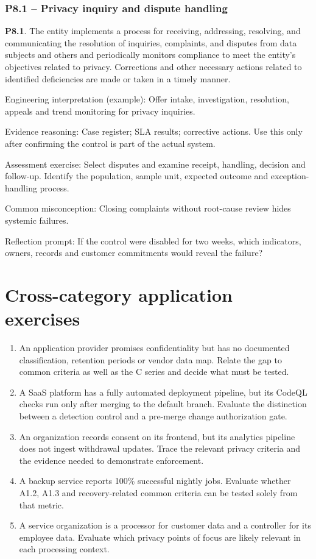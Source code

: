 \documentclass[10pt,oneside]{report}
\begin{document}
\subsection{P8.1 -- Privacy inquiry and dispute handling}
\begin{aicpabox}
\textbf{P8.1}. The entity implements a process for receiving, addressing, resolving, and communicating the resolution of inquiries, complaints, and disputes from data subjects and others and periodically monitors compliance to meet the entity's objectives related to privacy. Corrections and other necessary actions related to identified deficiencies are made or taken in a timely manner.\par{}
\end{aicpabox}
Engineering interpretation (example): Offer intake, investigation, resolution, appeals and trend monitoring for privacy inquiries.

Evidence reasoning: Case register; SLA results; corrective actions. Use this only after confirming the control is part of the actual system.

Assessment exercise: Select disputes and examine receipt, handling, decision and follow-up. Identify the population, sample unit, expected outcome and exception-handling process.

Common misconception: Closing complaints without root-cause review hides systemic failures.

Reflection prompt: If the control were disabled for two weeks, which indicators, owners, records and customer commitments would reveal the failure?

\chapter{Cross-category application exercises}
\begin{enumerate}
\item An application provider promises confidentiality but has no documented classification, retention periods or vendor data map. Relate the gap to common criteria as well as the C series and decide what must be tested.
\item A SaaS platform has a fully automated deployment pipeline, but its CodeQL checks run only after merging to the default branch. Evaluate the distinction between a detection control and a pre-merge change authorization gate.
\item An organization records consent on its frontend, but its analytics pipeline does not ingest withdrawal updates. Trace the relevant privacy criteria and the evidence needed to demonstrate enforcement.
\item A backup service reports 100\% successful nightly jobs. Evaluate whether A1.2, A1.3 and recovery-related common criteria can be tested solely from that metric.
\item A service organization is a processor for customer data and a controller for its employee data. Evaluate which privacy points of focus are likely relevant in each processing context.
\end{enumerate}
\end{document}
